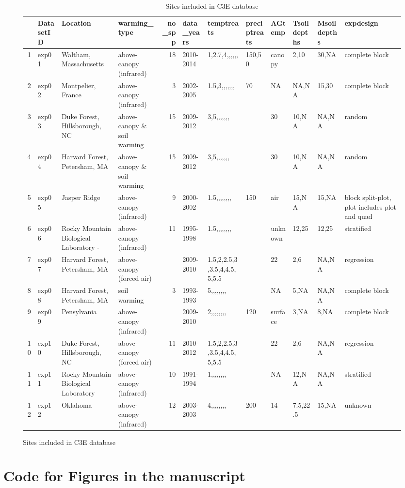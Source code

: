 \documentclass{article}
\begin{document}
\begin{figure}[p]
\begin{Schunk}
\begin{Sinput}
\end{Sinput}
% latex table generated in R 3.2.4 by xtable 1.8-2 package
% Tue Mar 28 22:28:15 2017
\begin{table}[ht]
\centering
\begin{tabular}{rlllrlllllll}
  \hline
 & DatasetID & Location & warming\_type & no\_spp & data\_years & temptreats & preciptreats & AGtemp & Tsoildepths & Msoildepths & expdesign \\ 
  \hline
1 & exp01 & Waltham, Massachusetts & above-canopy (infrared) &  18 & 2010-2014 & 1,2.7,4,,,,,, & 150,50 & canopy & 2,10 & 30,NA & complete block \\ 
  2 & exp02 & Montpelier, France & above-canopy (infrared) &   3 & 2002-2005 & 1.5,3,,,,,,, & 70 & NA & NA,NA & 15,30 & complete block \\ 
  3 & exp03 & Duke Forest, Hillsborough, NC & above-canopy \& soil warming &  15 & 2009-2012 & 3,5,,,,,,, &  & 30 & 10,NA & NA,NA & random \\ 
  4 & exp04 & Harvard Forest, Petersham, MA & above-canopy \& soil warming &  15 & 2009-2012 & 3,5,,,,,,, &  & 30 & 10,NA & NA,NA & random \\ 
  5 & exp05 & Jasper Ridge & above-canopy (infrared) &   9 & 2000-2002 & 1.5,,,,,,,, & 150 & air & 15,NA & 15,NA & block split-plot, plot includes plot and quad \\ 
  6 & exp06 & Rocky Mountain Biological Laboratory - & above-canopy (infrared) &  11 & 1995-1998 & 1.5,,,,,,,, &  & unknown & 12,25 & 12,25 & stratified \\ 
  7 & exp07 & Harvard Forest, Petersham, MA & above-canopy (forced air) &  & 2009-2010 & 1.5,2,2.5,3,3.5,4,4.5,5,5.5 &  & 22 & 2,6 & NA,NA & regression \\ 
  8 & exp08 & Harvard Forest, Petersham, MA & soil warming &   3 & 1993-1993 & 5,,,,,,,, &  & NA & 5,NA & NA,NA & complete block \\ 
  9 & exp09 & Pensylvania & above-canopy (infrared) &  & 2009-2010 & 2,,,,,,,, & 120 & surface & 3,NA & 8,NA & complete block \\ 
  10 & exp10 & Duke Forest, Hillsborough, NC & above-canopy (forced air) &  11 & 2010-2012 & 1.5,2,2.5,3,3.5,4,4.5,5,5.5 &  & 22 & 2,6 & NA,NA & regression \\ 
  11 & exp11 & Rocky Mountain Biological Laboratory & above-canopy (infrared) &  10 & 1991-1994 & 1,,,,,,,, &  & NA & 12,NA & NA,NA & stratified \\ 
  12 & exp12 & Oklahoma & above-canopy (infrared) &  12 & 2003-2003 & 4,,,,,,,, & 200 & 14 & 7.5,22.5 & 15,NA & unknown \\ 
   \hline
\end{tabular}
\caption{Sites included in C3E database} 
\end{table}\end{Schunk}
 \label{table:expsites}
 \end{figure}
\clearpage
\section* {Code for Figures in the manuscript}
\end{document}
